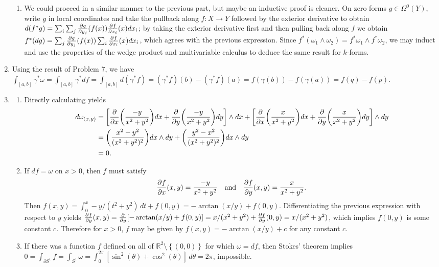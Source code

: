 \documentclass[11pt,leqno]{article}
\theoremstyle{plain}
\theoremstyle{definition}
\numberwithin{equation}{section}
\numberwithin{lem}{section}
\newcommand{\cbr}[1]{\left\{#1\right\}}
\begin{document}
\begin{enumerate}
\begin{enumerate}
      \item We could proceed in a similar manner to the previous part, but maybe an inductive proof is cleaner. On zero forms $g\in\Omega^0(Y)$, write $g$ in local coordinates and take the pullback along $f\colon X\to Y$ followed by the exterior derivative to obtain $d(f^\ast g) = \sum_i\sum_j\pdv{g}{y_j}\/(f(x))\pdv{f}{x_i}\/(x)dx_i$; by taking the exterior derivative first and then pulling back along $f$ we obtain $f^\ast(dg) = \sum_j\pdv{g}{y_j}\/(f(x))\sum_i\pdv{f}{x_i}\/(x)dx_i$, which agrees with the previous expression. Since $f^\ast(\omega_1\wedge \omega_2) = f^\ast\omega_1\wedge f^\ast\omega_2$, we may induct and use the properties of the wedge product and multivariable calculus to deduce the same result for $k$-forms.
    \end{enumerate}
    \item Using the result of Problem 7, we have $\int_{[a,b]} \gamma^\ast\omega = \int_{[a,b]}\gamma^\ast df = \int_{[a,b]}d(\gamma^\ast f) = (\gamma^\ast f)(b) - (\gamma^\ast f)(a) = f(\gamma(b)) - f(\gamma(a)) = f(q) - f(p)$.
    \item \begin{enumerate}
      \item Directly calculating yields 
      \begin{align*}
        d\omega_{(x,y)} &= \bigg[\pdv{x}\bigg(\frac{-y}{x^2+y^2}\bigg)dx + \pdv{y}\bigg(\frac{-y}{x^2+y^2}\bigg)dy\bigg]\wedge dx + \bigg[\pdv{x}\bigg(\frac{x}{x^2+y^2}\bigg)dx + \pdv{y}\bigg(\frac{x}{x^2+y^2}\bigg)dy\bigg]\wedge dy\\
        &= \bigg(\frac{x^2-y^2}{(x^2+y^2)^2}\bigg) dx\wedge dy + \bigg(\frac{y^2-x^2}{(x^2+y^2)^2}\bigg)dx\wedge dy\\
        &= 0.
      \end{align*}
      \item If $df = \omega$ on $x>0$, then $f$ must satisfy 
      \[\pdv{f}{x}\/(x,y) = \frac{-y}{x^2+y^2} \quad\text{and}\quad \pdv{f}{y}\/(x,y) = \frac{x}{x^2+y^2}.\]
      Then $f(x,y) = \int_0^x -y/(t^2+y^2)\,dt + f(0,y) = -\arctan(x/y) + f(0,y)$. Differentiating the previous expression with respect to $y$ yields $\pdv{f}{y}\/(x,y) = \pdv{y}[-\arctan(x/y) + f(0,y)] = x/(x^2+y^2) + \pdv{f}{y}\/(0,y) = x/(x^2+y^2)$, which implies $f(0,y)$ is some constant $c$. Therefore for $x>0$, $f$ may be given by $f(x,y) = -\arctan(x/y) + c$ for any constant $c$.
      \item If there was a function $f$ defined on all of $\mathbb R^2\setminus\cbr{(0,0)}$ for which $\omega = df$, then Stokes' theorem implies $0 = \int_{\partial S^1}f = \int_{S^1}\omega = \int_0^{2\pi}[\sin^2(\theta) + \cos^2(\theta)]\,d\theta = 2\pi$, impossible.
    \end{enumerate}
\end{enumerate}
\end{document}
